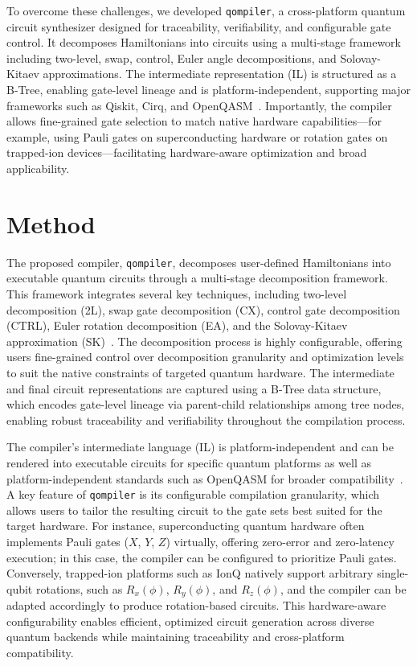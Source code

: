\documentclass[conference]{IEEEtran}
\begin{document}
    To overcome these challenges, we developed \texttt{qompiler}, a cross-platform quantum circuit synthesizer designed for traceability, verifiability, and configurable gate control.
    It decomposes Hamiltonians into circuits using a multi-stage framework including two-level, swap, control, Euler angle decompositions, and Solovay-Kitaev approximations.
    The intermediate representation (IL) is structured as a B-Tree, enabling gate-level lineage and is platform-independent, supporting major frameworks
    such as Qiskit, Cirq, and OpenQASM~\cite{cirq2024,qiskit2023,openqasm2,openqasm3}.
    Importantly, the compiler allows fine-grained gate selection to match native hardware capabilities—for example,
    using Pauli gates on superconducting hardware or rotation gates on trapped-ion devices—facilitating hardware-aware optimization and broad applicability.


    \section{Method}\label{sec:method}
    The proposed compiler, \texttt{qompiler}, decomposes user-defined Hamiltonians into executable quantum circuits
    through a multi-stage decomposition framework.
    This framework integrates several key techniques, including two-level decomposition (2L), swap gate decomposition (CX),
    control gate decomposition (CTRL), Euler rotation decomposition (EA), and the Solovay-Kitaev approximation (SK)~\cite{nielsen2010quantum,dawson2005solovaykitaevalgorithm}.
    The decomposition process is highly configurable, offering users fine-grained control over decomposition granularity
    and optimization levels to suit the native constraints of targeted quantum hardware.
    The intermediate and final circuit representations are captured using a B-Tree data structure,
    which encodes gate-level lineage via parent-child relationships among tree nodes, enabling robust traceability
    and verifiability throughout the compilation process.

    The compiler’s intermediate language (IL) is platform-independent and can be rendered into executable circuits for specific quantum platforms
    as well as platform-independent standards such as OpenQASM for broader compatibility~\cite{openqasm2,openqasm3}.
    A key feature of \texttt{qompiler} is its configurable compilation granularity,
    which allows users to tailor the resulting circuit to the gate sets best suited for the target hardware.
    For instance, superconducting quantum hardware often implements Pauli gates ($X$, $Y$, $Z$) virtually, offering zero-error and zero-latency execution;
    in this case, the compiler can be configured to prioritize Pauli gates.
    Conversely, trapped-ion platforms such as IonQ natively support arbitrary single-qubit rotations,
    such as $R_x(\phi)$, $R_y(\phi)$, and $R_z(\phi)$, and the compiler can be adapted accordingly to produce rotation-based circuits.
    This hardware-aware configurability enables efficient, optimized circuit generation across diverse quantum backends
    while maintaining traceability and cross-platform compatibility.
\end{document}
